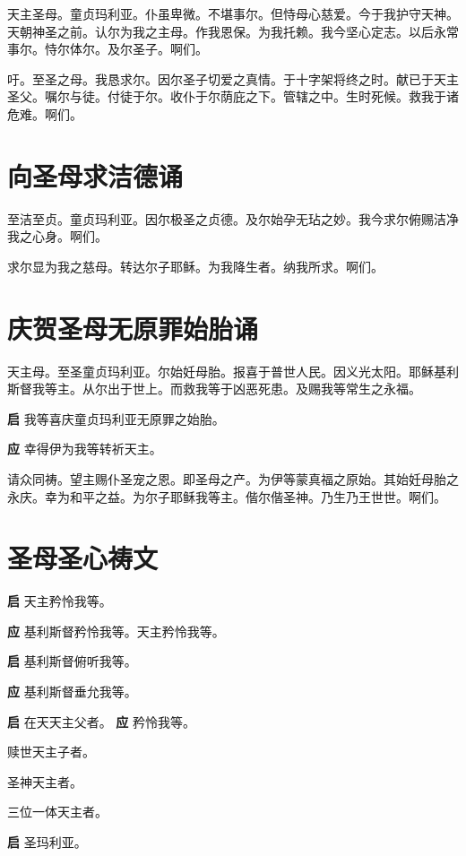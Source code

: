 \documentclass[UTF8,17pt]{ctexart}
\begin{document}
天主圣母。童贞玛利亚。仆虽卑微。不堪事尔。但恃母⼼慈爱。今于我护守天神。天朝神圣之前。认尔为我之主母。作我恩保。为我托赖。我今坚⼼定志。以后永常事尔。恃尔体尔。及尔圣⼦。啊们。

吁。⾄圣之母。我恳求尔。因尔圣⼦切爱之真情。于⼗字架将终之时。献已于天主圣⽗。嘱尔与徒。付徒于尔。收仆于尔荫庇之下。管辖之中。⽣时死候。救我于诸危难。啊们。

\section{向圣母求洁德诵}

⾄洁⾄贞。童贞玛利亚。因尔极圣之贞德。及尔始孕⽆玷之妙。我今求尔俯赐洁净我之⼼⾝。啊们。

求尔显为我之慈母。转达尔⼦耶稣。为我降⽣者。纳我所求。啊们。

\section{庆贺圣母⽆原罪始胎诵}

天主母。⾄圣童贞玛利亚。尔始妊母胎。报喜于普世⼈民。因义光太阳。耶稣基利斯督我等主。从尔出于世上。⽽救我等于凶恶死患。及赐我等常⽣之永福。

\textbf{启} \quad 我等喜庆童贞玛利亚⽆原罪之始胎。

\textbf{应} \quad 幸得伊为我等转祈天主。

请众同祷。望主赐仆圣宠之恩。即圣母之产。为伊等蒙真福之原始。其始妊母胎之永庆。幸为和平之益。为尔⼦耶稣我等主。偕尔偕圣神。乃⽣乃王世世。啊们。

\section{圣母圣⼼祷⽂}

\textbf{启} \quad 天主矜怜我等。

\textbf{应} \quad 基利斯督矜怜我等。天主矜怜我等。

\textbf{启} \quad 基利斯督俯听我等。

\textbf{应} \quad 基利斯督垂允我等。

\textbf{启} \quad 在天天主⽗者。 \hfill \textbf{应} \quad 矜怜我等。

 赎世天主⼦者。

 圣神天主者。

 三位⼀体天主者。

\textbf{启} \quad 圣玛利亚。
\end{document}
